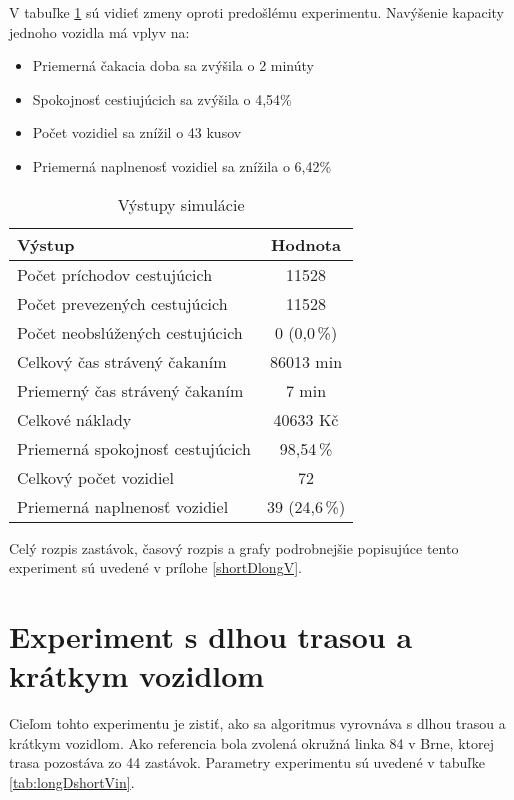 V tabuľke \ref{tab:shortDlongVout} sú vidieť zmeny oproti predošlému experimentu.
Navýšenie kapacity jednoho vozidla má vplyv na:
\begin{itemize}
  \item Priemerná čakacia doba sa zvýšila o 2 minúty
  \item Spokojnosť cestiujúcich sa zvýšila o 4,54\%
  \item Počet vozidiel sa znížil o 43 kusov
  \item Priemerná naplnenosť vozidiel sa znížila o 6,42\%
\end{itemize}

\begin{table}[h]
  \centering
  \begin{tabular}{|l|c|}
    \hline
      \textbf{Výstup} & \textbf{Hodnota} \\ \hline
      Počet príchodov cestujúcich & 11528 \\ \hline
      Počet prevezených cestujúcich & 11528 \\ \hline
      Počet neobslúžených cestujúcich & 0 (0,0\,\%) \\ \hline
      Celkový čas strávený čakaním & 86013 min \\ \hline
      Priemerný čas strávený čakaním & 7 min \\ \hline
      Celkové náklady & 40633 Kč \\ \hline
      Priemerná spokojnosť cestujúcich & 98,54\,\% \\ \hline
      Celkový počet vozidiel & 72 \\ \hline
      Priemerná naplnenosť vozidiel & 39 (24,6\,\%) \\ \hline
  \end{tabular}
  \caption{Výstupy simulácie}
  \label{tab:shortDlongVout}
\end{table}

Celý rozpis zastávok, časový rozpis a grafy podrobnejšie popisujúce tento experiment sú uvedené v prílohe \ref{shortDlongV}.

\newpage

\section{Experiment s dlhou trasou a krátkym vozidlom}
Cieľom tohto experimentu je zistiť, ako sa algoritmus vyrovnáva s dlhou trasou a krátkym vozidlom.
Ako referencia bola zvolená okružná linka 84 v Brne, ktorej trasa pozostáva zo 44 zastávok.
Parametry experimentu sú uvedené v tabuľke \ref{tab:longDshortVin}.

